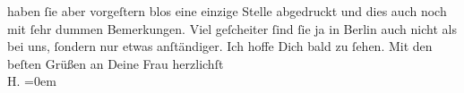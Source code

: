 \begin{ledgroupsized}[t]{13cm}
               haben ſie aber vorgeſtern blos eine einzige Stelle abgedruckt und dies auch noch mit
               ſehr dummen Bemerkungen. Viel geſcheiter ſind ſie ja in Berlin auch nicht als {\pb}bei
               uns, ſondern nur etwas anſtändiger.\pend
           \pstart
           Ich hoffe Dich bald zu ſehen. Mit den beſten Grüßen an Deine Frau\pend
           \pstart
           herzlichſt{\\[\baselineskip]}\spacefill\mbox{H.}\pend
           \leftskip=0em{}
         
         \endnumbering{}\end{ledgroupsized}  \newcommand{\dateiname}{L01352}\newcommand{\titel}{Hermann Bahr an Arthur Schnitzler, 16. 12. [1903]}\newcommand{\editorInnen}{ Kurt Ifkovits,  Martin Anton Müller}
      
